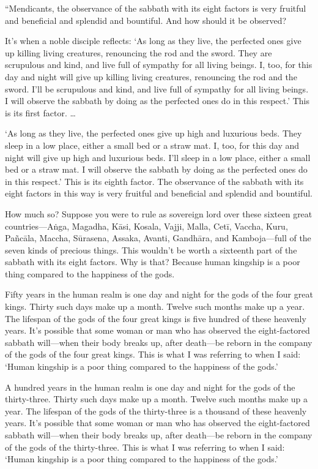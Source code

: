 \documentclass[12pt,openany]{book}%
\begin{document}
“Mendicants, the observance of the sabbath with its eight factors is very fruitful and beneficial and splendid and bountiful. And how should it be observed? 

It’s when a noble disciple reflects: ‘As long as they live, the perfected ones give up killing living creatures, renouncing the rod and the sword. They are scrupulous and kind, and live full of sympathy for all living beings. I, too, for this day and night will give up killing living creatures, renouncing the rod and the sword. I’ll be scrupulous and kind, and live full of sympathy for all living beings. I will observe the sabbath by doing as the perfected ones do in this respect.’ This is its first factor. … 

‘As long as they live, the perfected ones give up high and luxurious beds. They sleep in a low place, either a small bed or a straw mat. I, too, for this day and night will give up high and luxurious beds. I’ll sleep in a low place, either a small bed or a straw mat. I will observe the sabbath by doing as the perfected ones do in this respect.’ This is its eighth factor. The observance of the sabbath with its eight factors in this way is very fruitful and beneficial and splendid and bountiful. 

How much so? Suppose you were to rule as sovereign lord over these sixteen great countries—\textsanskrit{Aṅga}, Magadha, \textsanskrit{Kāsi}, Kosala, Vajji, Malla, \textsanskrit{Cetī}, Vaccha, Kuru, \textsanskrit{Pañcāla}, Maccha, \textsanskrit{Sūrasena}, Assaka, Avanti, \textsanskrit{Gandhāra}, and Kamboja—full of the seven kinds of precious things. This wouldn’t be worth a sixteenth part of the sabbath with its eight factors. Why is that? Because human kingship is a poor thing compared to the happiness of the gods. 

Fifty years in the human realm is one day and night for the gods of the four great kings. Thirty such days make up a month. Twelve such months make up a year. The lifespan of the gods of the four great kings is five hundred of these heavenly years. It’s possible that some woman or man who has observed the eight-factored sabbath will—when their body breaks up, after death—be reborn in the company of the gods of the four great kings. This is what I was referring to when I said: ‘Human kingship is a poor thing compared to the happiness of the gods.’ 

A hundred years in the human realm is one day and night for the gods of the thirty-three. Thirty such days make up a month. Twelve such months make up a year. The lifespan of the gods of the thirty-three is a thousand of these heavenly years. It’s possible that some woman or man who has observed the eight-factored sabbath will—when their body breaks up, after death—be reborn in the company of the gods of the thirty-three. This is what I was referring to when I said: ‘Human kingship is a poor thing compared to the happiness of the gods.’ 
\end{document}
